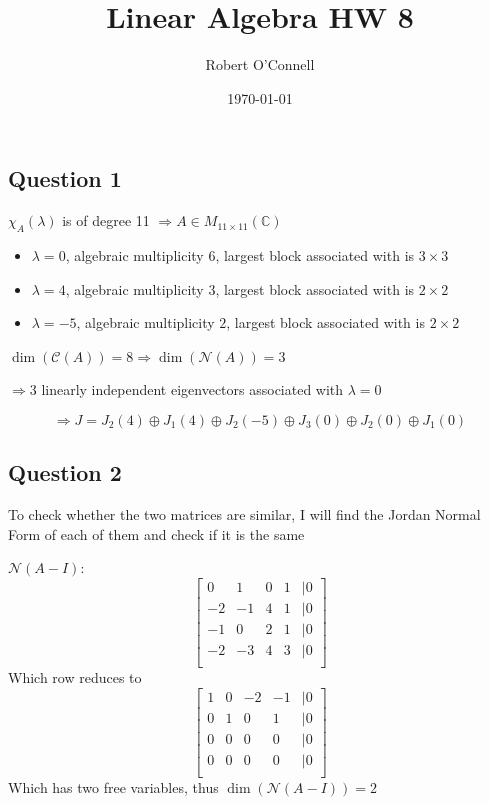 \documentclass{article}
\title{\textbf{Linear Algebra HW 8}}
\author{Robert O'Connell}
\date{\today}
\begin{document}
\maketitle
\vspace{5mm}
\subsection*{Question 1}
\(\chi_A(\lambda)\) is of degree 11 \(\Rightarrow A \in M_{11 \times 11}(\mathbb{C})\)

\begin{itemize}
    \item \(\lambda = 0\), algebraic multiplicity \(6\), largest block associated with is \(3 \times 3\)
    \item \(\lambda = 4\), algebraic multiplicity \(3\), largest block associated with is \(2 \times 2\)
    \item \(\lambda = -5\), algebraic multiplicity \(2\), largest block associated with is \(2 \times 2\)
\end{itemize}

\(\dim(\mathcal{C}(A)) = 8 \Rightarrow \dim(\mathcal{N}(A)) = 3\)

\(\Rightarrow 3\) linearly independent eigenvectors associated with \(\lambda = 0\)

\[
\Rightarrow J = J_2(4) \oplus J_1(4) \oplus J_2(-5) \oplus J_3(0) \oplus J_2(0) \oplus J_1(0)
\]

\subsection*{Question 2}
To check whether the two matrices are similar, I will find the Jordan Normal Form
of each of them and check if it is the same

\(\mathcal{N}(A-I):\)
\[
\begin{bmatrix}
    0 & 1 & 0 & 1 & | 0 \\
    -2 & -1 & 4 & 1 & | 0 \\
    -1 & 0 & 2 & 1 & | 0 \\
    -2 & -3 & 4 & 3 & | 0 \\
\end{bmatrix}
\]
Which row reduces to 
\[
\begin{bmatrix}
    1 & 0 & -2 & -1 & | 0 \\
    0 & 1 & 0 & 1 & | 0 \\
    0 & 0 & 0 & 0 & | 0 \\
    0 & 0 & 0 & 0 & | 0 \\
\end{bmatrix}
\]
Which has two free variables, thus \(\dim(\mathcal{N}(A-I)) = 2\)
\end{document}
